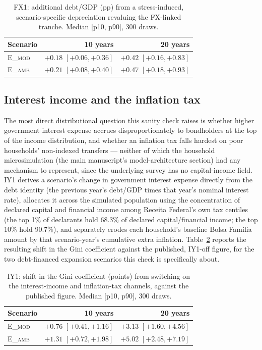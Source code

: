 \documentclass[11pt,a4paper]{article}
\begin{document}
\begin{table}[htbp]
\centering\small
\caption{FX1: additional debt/GDP (pp) from a stress-induced, scenario-specific depreciation revaluing the FX-linked tranche. Median [p10, p90], 300 draws.}
\label{tab:fx1}
\begin{tabular}{lrr}
\toprule
Scenario & 10 years & 20 years \\
\midrule
\textsc{E\_mod} & $+0.18$ $[+0.06,+0.36]$ & $+0.42$ $[+0.16,+0.83]$ \\
\textsc{E\_amb} & $+0.21$ $[+0.08,+0.40]$ & $+0.47$ $[+0.18,+0.93]$ \\
\bottomrule
\end{tabular}
\end{table}

\subsection{Interest income and the inflation tax}

The most direct distributional question this sanity check raises is whether higher government interest expense accrues disproportionately to bondholders at the top of the income distribution, and whether an inflation tax falls hardest on poor households' non-indexed transfers --- neither of which the household microsimulation (the main manuscript's model-architecture section) had any mechanism to represent, since the underlying survey has no capital-income field. IY1 derives a scenario's change in government interest expense directly from the debt identity (the previous year's debt/GDP times that year's nominal interest rate), allocates it across the simulated population using the concentration of declared capital and financial income among Receita Federal's own tax centiles \citep{receitafederal2024} (the top 1\% of declarants hold 68.3\% of declared capital/financial income; the top 10\% hold 90.7\%), and separately erodes each household's baseline Bolsa Fam\'ilia amount by that scenario-year's cumulative extra inflation. Table~\ref{tab:iy1} reports the resulting shift in the Gini coefficient against the published, IY1-off figure, for the two debt-financed expansion scenarios this check is specifically about.

\begin{table}[htbp]
\centering\small
\caption{IY1: shift in the Gini coefficient (points) from switching on the interest-income and inflation-tax channels, against the published figure. Median [p10, p90], 300 draws.}
\label{tab:iy1}
\begin{tabular}{lrr}
\toprule
Scenario & 10 years & 20 years \\
\midrule
\textsc{E\_mod} & $+0.76$ $[+0.41,+1.16]$ & $+3.13$ $[+1.60,+4.56]$ \\
\textsc{E\_amb} & $+1.31$ $[+0.72,+1.98]$ & $+5.02$ $[+2.48,+7.19]$ \\
\bottomrule
\end{tabular}
\end{table}
\end{document}
